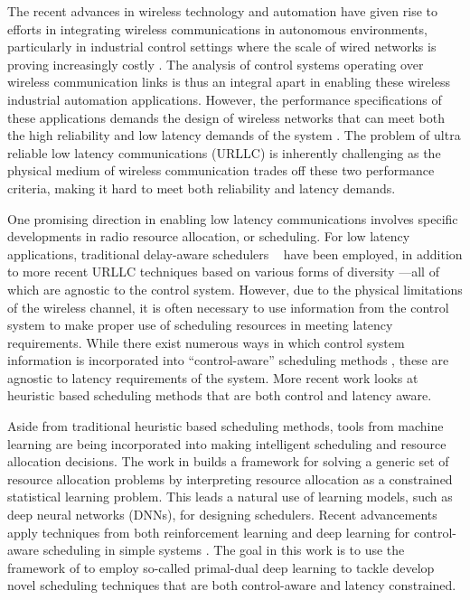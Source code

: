 \documentclass[conference,10pt]{IEEEtran}
\begin{document}
The recent advances in wireless technology and automation have given rise to efforts in integrating wireless communications in autonomous environments, particularly in industrial control settings where the scale of wired networks is proving increasingly costly \cite{zand2012wireless, wollschlaeger2017future}. The analysis of control systems operating over wireless communication links is thus an integral apart in enabling these wireless industrial automation applications. However, the performance specifications of these applications demands the design of wireless networks that can meet both the high reliability and low latency demands of the system \cite{zand2012wireless, varghese2014wireless, weiner2014design, popovski2018wireless, bennis2018ultra}. The problem of ultra reliable low latency communications (URLLC) is inherently challenging as the physical medium of wireless communication trades off these two performance criteria, making it hard to meet both reliability and latency demands.

One promising direction in enabling low latency communications involves specific developments in radio resource allocation, or scheduling. For low latency applications, traditional delay-aware schedulers ~\cite{wu2014analysis, lu1999fair, andrews2001providing} have been employed, in addition to more recent URLLC techniques based on various forms of diversity \cite{swamy2015cooperative, popovski2018wireless, nielsen2018ultra, ashraf2018dynamic}---all of which are agnostic to the control system. However, due to the physical limitations of the wireless channel, it is often necessary to use information from the control system to make proper use of scheduling resources in meeting latency requirements. While there exist numerous ways in which control system information is incorporated into ``control-aware'' scheduling methods \cite{Cervin_event_scheduling, mamduhi2014event,shi2011optimal,han2017optimal, GatsisEtal15,demirel2018deepcas,leong2018deep}, these are agnostic to latency requirements of the system. More recent work \cite{eisen2018control} looks at heuristic based scheduling methods that are both control and latency aware. 

Aside from traditional heuristic based scheduling methods, tools from machine learning are being incorporated into making intelligent scheduling and resource allocation decisions. The work in \cite{eisen2018learninga} builds a framework for solving a generic set of resource allocation problems by interpreting resource allocation as a constrained statistical learning problem. This leads a natural use of learning models, such as deep neural networks (DNNs), for designing schedulers. Recent advancements apply techniques from both reinforcement learning and deep learning for control-aware scheduling in simple systems \cite{demirel2018deepcas,leong2018deep}. The goal in this work is to use the framework of \cite{eisen2018learninga} to employ so-called primal-dual deep learning to tackle develop novel scheduling techniques that are both control-aware and latency constrained. 
\end{document}

